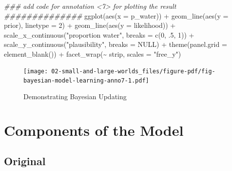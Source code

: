 \documentclass[
  letterpaper,
  DIV=11,
  numbers=noendperiod]{scrreprt}
\newenvironment{Shaded}{\begin{snugshade}}{\end{snugshade}}
\newcommand{\AttributeTok}[1]{\textcolor[rgb]{0.40,0.45,0.13}{#1}}
\newcommand{\ConstantTok}[1]{\textcolor[rgb]{0.56,0.35,0.01}{#1}}
\newcommand{\DecValTok}[1]{\textcolor[rgb]{0.68,0.00,0.00}{#1}}
\newcommand{\DocumentationTok}[1]{\textcolor[rgb]{0.37,0.37,0.37}{\textit{#1}}}
\newcommand{\FunctionTok}[1]{\textcolor[rgb]{0.28,0.35,0.67}{#1}}
\newcommand{\InformationTok}[1]{\textcolor[rgb]{0.37,0.37,0.37}{#1}}
\newcommand{\NormalTok}[1]{\textcolor[rgb]{0.00,0.23,0.31}{#1}}
\newcommand{\SpecialCharTok}[1]{\textcolor[rgb]{0.37,0.37,0.37}{#1}}
\newcommand{\StringTok}[1]{\textcolor[rgb]{0.13,0.47,0.30}{#1}}
\newcommand*\circled[1]{\tikz[baseline=(char.base)]{
          \node[shape=circle,draw,inner sep=1pt] (char) {{\scriptsize#1}};}}
\begin{document}
\begin{Shaded}
\begin{Highlighting}[]
  \DocumentationTok{\#\#\# add code for annotation \textless{}7\textgreater{} for plotting the result \#\#\#\#\#\#\#\#\#\#\#\#\#\#}
  \FunctionTok{ggplot}\NormalTok{(}\FunctionTok{aes}\NormalTok{(}\AttributeTok{x =}\NormalTok{ p\_water)) }\SpecialCharTok{+} \hspace*{\fill}\NormalTok{\circled{7}}
  \FunctionTok{geom\_line}\NormalTok{(}\FunctionTok{aes}\NormalTok{(}\AttributeTok{y =}\NormalTok{ prior), }
            \AttributeTok{linetype =} \DecValTok{2}\NormalTok{) }\SpecialCharTok{+} 
  \FunctionTok{geom\_line}\NormalTok{(}\FunctionTok{aes}\NormalTok{(}\AttributeTok{y =}\NormalTok{ likelihood)) }\SpecialCharTok{+} 
  \FunctionTok{scale\_x\_continuous}\NormalTok{(}\StringTok{"proportion water"}\NormalTok{, }\AttributeTok{breaks =} \FunctionTok{c}\NormalTok{(}\DecValTok{0}\NormalTok{, .}\DecValTok{5}\NormalTok{, }\DecValTok{1}\NormalTok{)) }\SpecialCharTok{+} 
  \FunctionTok{scale\_y\_continuous}\NormalTok{(}\StringTok{"plausibility"}\NormalTok{, }\AttributeTok{breaks =} \ConstantTok{NULL}\NormalTok{) }\SpecialCharTok{+} 
  \FunctionTok{theme}\NormalTok{(}\AttributeTok{panel.grid =} \FunctionTok{element\_blank}\NormalTok{()) }\SpecialCharTok{+} 
  \FunctionTok{facet\_wrap}\NormalTok{(}\SpecialCharTok{\textasciitilde{}}\NormalTok{ strip, }\AttributeTok{scales =} \StringTok{"free\_y"}\NormalTok{) }
\InformationTok{\textasciigrave{}\textasciigrave{}\textasciigrave{}}
\end{Highlighting}
\end{Shaded}

\begin{figure}[H]

{\centering \texttt{[image: 02-small-and-large-worlds\_files/figure-pdf/fig-bayesian-model-learning-anno7-1.pdf]}

}

\caption{\label{fig-bayesian-model-learning-anno7}Demonstrating Bayesian
Updating}

\end{figure}

\hypertarget{components-of-the-model}{%
\section{Components of the Model}\label{components-of-the-model}}

\hypertarget{original-3}{%
\subsection{Original}\label{original-3}}
\end{document}
